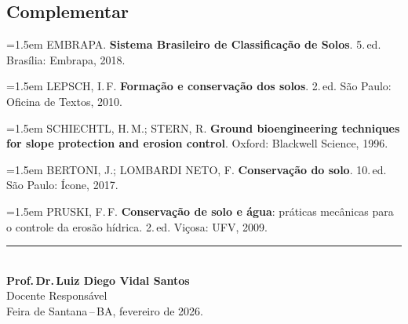 \documentclass[11pt,a4paper]{article}
\begin{document}
\subsection*{Complementar}

\begin{small}
\hangindent=1.5em
EMBRAPA. \textbf{Sistema Brasileiro de Classificação de Solos}. 5.\,ed. Brasília: Embrapa, 2018.\par\medskip

\hangindent=1.5em
LEPSCH, I.\,F. \textbf{Formação e conservação dos solos}. 2.\,ed. São Paulo: Oficina de Textos, 2010.\par\medskip

\hangindent=1.5em
SCHIECHTL, H.\,M.; STERN, R. \textbf{Ground bioengineering techniques for slope protection and erosion control}. Oxford: Blackwell Science, 1996.\par\medskip

\hangindent=1.5em
BERTONI, J.; LOMBARDI NETO, F. \textbf{Conservação do solo}. 10.\,ed. São Paulo: Ícone, 2017.\par\medskip

\hangindent=1.5em
PRUSKI, F.\,F. \textbf{Conservação de solo e água}: práticas mecânicas para o controle da erosão hídrica. 2.\,ed. Viçosa: UFV, 2009.\par\medskip
\end{small}



\vfill

\begin{center}
\noindent\rule{6cm}{0.4pt}\\[6pt]
\textbf{Prof.\,Dr.\,Luiz Diego Vidal Santos}\\
Docente Responsável\\[4pt]
{\small Feira de Santana\,--\,BA, fevereiro de 2026.}
\end{center}
\end{document}
